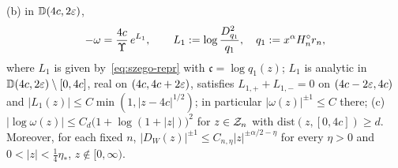 \begin{lemma}
\begin{enumerate}
(b) in $\mathbb D(4c,2\varepsilon)$,
\begin{equation}\label{eq:omega-4c}
  -\omega=\frac{4c}{\Upsilon}\,e^{L_1},\qquad L_1:=\log\frac{D_{q_1}^2}{q_1},\quad q_1:=x^\alpha H^{\circ}_n r_n ,
\end{equation}
where $L_1$ is given by~\eqref{eq:szego-repr} with $\mathfrak c=\log q_1(z)$; $L_1$ is analytic in
$\mathbb D(4c,2\varepsilon)\setminus[0,4c]$, real on $(4c,4c+2\varepsilon)$, satisfies $L_{1,+}+L_{1,-}=0$ on $(4c-2\varepsilon,4c)$ and
$|L_1(z)|\le C\min(1,|z-4c|^{1/2})$; in particular $|\omega(z)|^{\pm1}\le C$ there;
(c) $|\log\omega(z)|\le C_d\bigl(1+\log(1+|z|)\bigr)^2$ for $z\in\mathcal{Z}_n$ with $\mathrm{dist}(z,[0,4c])\ge d$.
Moreover, for each fixed $n$, $|D_W(z)|^{\pm1}\le C_{n,\eta}|z|^{\pm\alpha/2-\eta}$ for every $\eta>0$ and
$0<|z|<\frac14\eta_*$, $z\notin[0,\infty)$.
\end{enumerate}
\end{lemma}


